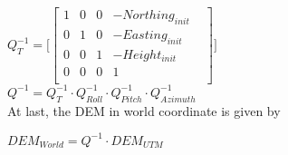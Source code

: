 $Q_{T}^{-1}=\lbrack \begin{bmatrix}
1 & 0 & 0 & -Northing_{init} & \\
0 & 1 & 0 & -Easting_{init} & \\
0 & 0 & 1 & -Height_{init} & \\
0 & 0 & 0 & 1 & \\
\end{bmatrix}
\rbrack $\\


$Q^{-1}=Q_{T}^{-1}\cdot Q_{Roll}^{-1}\cdot Q_{Pitch}^{-1}\cdot 
Q_{Azimuth}^{-1}$\\


At last, the DEM in world coordinate is given by

$DEM_{World}=Q^{-1}\cdot DEM_{UTM}$\\


